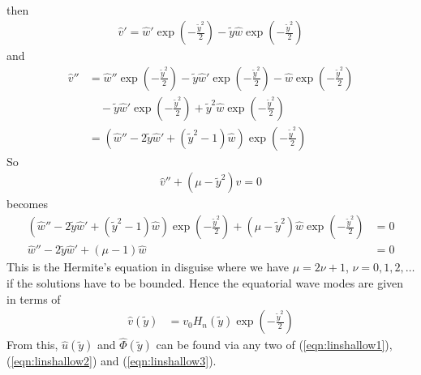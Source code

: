 \begin{solution}
\begin{align*}
\end{align*}
then 
\begin{align*}
\hat{v}' = \hat{w}' \exp(-\frac{\tilde{y}^2}{2}) - \tilde{y}\hat{w} \exp(-\frac{\tilde{y}^2}{2})
\end{align*}
and
\begin{align*}
\hat{v}'' &= \hat{w}'' \exp(-\frac{\tilde{y}^2}{2}) - \tilde{y}\hat{w}' \exp(-\frac{\tilde{y}^2}{2}) - \hat{w} \exp(-\frac{\tilde{y}^2}{2}) \\
&\quad - \tilde{y}\hat{w}' \exp(-\frac{\tilde{y}^2}{2}) + \tilde{y}^2\hat{w} \exp(-\frac{\tilde{y}^2}{2}) \\
&= (\hat{w}'' - 2\tilde{y}\hat{w}' + (\tilde{y}^2-1)\hat{w})\exp(-\frac{\tilde{y}^2}{2})
\end{align*}
So
\begin{align*}
\hat{v}'' + (\mu - \tilde{y}^2)\hat{v} = 0
\end{align*}
becomes
\begin{align*}
(\hat{w}'' - 2\tilde{y}\hat{w}' + (\tilde{y}^2-1)\hat{w})\exp(-\frac{\tilde{y}^2}{2}) + (\mu - \tilde{y}^2)\hat{w} \exp(-\frac{\tilde{y}^2}{2}) &= 0 \\
\hat{w}'' - 2\tilde{y}\hat{w}' + (\mu-1)\hat{w} &= 0
\end{align*}
This is the Hermite's equation in disguise where we have $\mu = 2\nu + 1$, $\nu = 0, 1, 2, \ldots$ if the solutions have to be bounded. Hence the equatorial wave modes are given in terms of
\begin{align*}
\hat{v}(\tilde{y}) &= v_0H_n(\tilde{y})\exp(-\frac{\tilde{y}^2}{2})    
\end{align*}
From this, $\hat{u}(\tilde{y})$ and $\hat{\Phi}(\tilde{y})$ can be found via any two of (\ref{eqn:linshallow1}), (\ref{eqn:linshallow2}) and (\ref{eqn:linshallow3}).

\end{solution}
